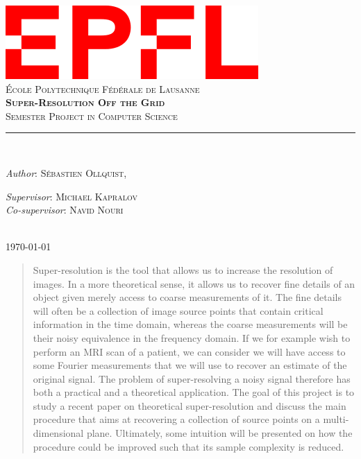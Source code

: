 \documentclass[11pt,titlepage]{report}
\begin{document}
\begin{titlepage}
	\centering
    \includegraphics[width=0.4\linewidth]{images/EPFL.png}\\[0.25cm] 	%
    \textsc{\LARGE École Polytechnique Fédérale de Lausanne}\\ \vspace{\fill}
    \textbf{\textsc{\fontsize{30}{30}\selectfont Super-Resolution Off the Grid}}\\ \vspace{\fill}		
	\textsc{\LARGE Semester Project in Computer Science}\\[0.4cm]
	\rule{\linewidth}{0.2 mm} \\[0.5 cm]
    \begin{minipage}[c]{0.4\linewidth}
        \textit{Author}: \textsc{Sébastien Ollquist},
    \end{minipage}
    \begin{minipage}[c]{0.4\linewidth}
        \textit{Supervisor}: {\small\textsc{Michael Kapralov}} \\
        \textit{Co-supervisor}: {\small\textsc{Navid Nouri}}
    \end{minipage}
	\\[2cm] \today
\end{titlepage}
\restoregeometry

\thispagestyle{numberonly}
\begin{abstract}
    Super-resolution is the tool that allows us to increase the resolution of images. In a more theoretical sense, it allows us to recover fine details of an object given merely access to coarse measurements of it. The fine details will often be a collection of image source points that contain critical information in the time domain, whereas the coarse measurements will be their noisy equivalence in the frequency domain. If we for example wish to perform an MRI scan of a patient, we can consider we will have access to some Fourier measurements that we will use to recover an estimate of the original signal. The problem of super-resolving a noisy signal therefore has both a practical and a theoretical application. The goal of this project is to study a recent paper on theoretical super-resolution and discuss the main procedure that aims at recovering a collection of source points on a multi-dimensional plane. Ultimately, some intuition will be presented on how the procedure could be improved such that its sample complexity is reduced.
\end{abstract}
\end{document}
